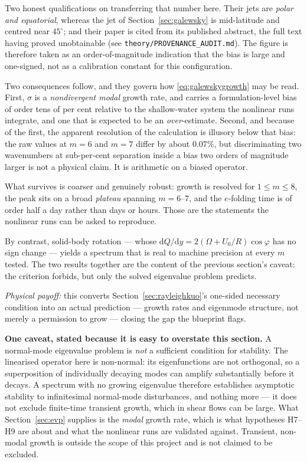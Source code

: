 \documentclass[11pt,a4paper]{article}
\newcommand{\file}[1]{\texttt{\nolinkurl{#1}}}
\newcommand{\dd}{\mathrm{d}}
\begin{document}
Two honest qualifications on transferring that number here. Their jets are
\emph{polar and equatorial}, whereas the jet of Section~\ref{sec:galewsky} is
mid-latitude and centred near $45^\circ$; and their paper is cited from its
published abstract, the full text having proved unobtainable (see
\file{theory/PROVENANCE_AUDIT.md}). The figure is therefore taken as an
order-of-magnitude indication that the bias is large and one-signed, not as a
calibration constant for this configuration.

Two consequences follow, and they govern how \eqref{eq:galewskygrowth} may be
read. First, $\sigma$ is a \emph{nondivergent modal} growth rate, and carries a
formulation-level bias of order tens of per cent relative to the shallow-water
system the nonlinear runs integrate, and one that is expected to be an
\emph{over}-estimate. Second, and because of the first, the apparent resolution
of the calculation is illusory below that bias: the raw values at $m = 6$ and
$m = 7$ differ by about $0.07\%$, but discriminating two wavenumbers at
sub-per-cent separation inside a bias two orders of magnitude larger is not a
physical claim. It is arithmetic on a biased operator.

What survives is coarser and genuinely robust: growth is resolved for
$1 \le m \le 8$, the peak sits on a broad \emph{plateau} spanning $m = 6$--$7$,
and the $e$-folding time is of order half a day rather than days or hours. Those
are the statements the nonlinear runs can be asked to reproduce.

By contrast, solid-body rotation --- whose $\dd Q/\dd y = 2(\Omega + U_0/R)
\cos\varphi$ has no sign change --- yields a spectrum that is real to machine
precision at every $m$ tested. The two results together are the content of the
previous section's caveat: the criterion forbids, but only the solved eigenvalue
problem predicts.

\medskip
\noindent\emph{Physical payoff:} this converts Section~\ref{sec:rayleighkuo}'s
one-sided necessary condition into an actual prediction --- growth rates and
eigenmode structure, not merely a permission to grow --- closing the gap the
blueprint flags.

\medskip
\noindent\textbf{One caveat, stated because it is easy to overstate this
section.} A normal-mode eigenvalue problem is \emph{not} a sufficient condition
for stability. The linearised operator here is non-normal: its eigenfunctions
are not orthogonal, so a superposition of individually decaying modes can
amplify substantially before it decays. A spectrum with no growing eigenvalue
therefore establishes asymptotic stability to infinitesimal normal-mode
disturbances, and nothing more --- it does not exclude finite-time transient
growth, which in shear flows can be large. What Section~\ref{sec:evp} supplies
is the \emph{modal} growth rate, which is what hypotheses H7--H9 are about and
what the nonlinear runs are validated against. Transient, non-modal growth is
outside the scope of this project and is not claimed to be excluded.
\end{document}
